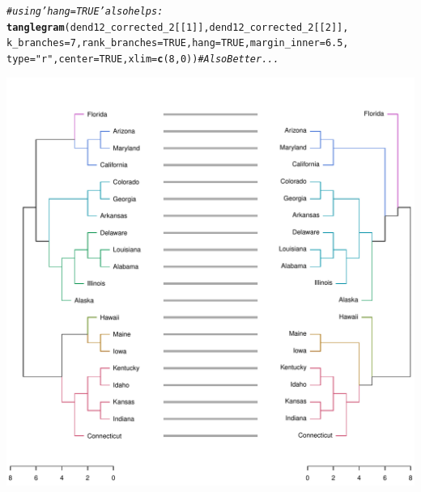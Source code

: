 \documentclass[shortnames,nojss,article]{jss}\usepackage[]{graphicx}\usepackage[]{color}
\makeatletter
\def\maxwidth{ %
  \ifdim\Gin@nat@width>\linewidth
    \linewidth
  \else
    \Gin@nat@width
  \fi
}
\newcommand{\hlnum}[1]{\textcolor[rgb]{0.686,0.059,0.569}{#1}}%
\newcommand{\hlstr}[1]{\textcolor[rgb]{0.192,0.494,0.8}{#1}}%
\newcommand{\hlcom}[1]{\textcolor[rgb]{0.678,0.584,0.686}{\textit{#1}}}%
\newcommand{\hlstd}[1]{\textcolor[rgb]{0.345,0.345,0.345}{#1}}%
\newcommand{\hlkwc}[1]{\textcolor[rgb]{0.333,0.667,0.333}{#1}}%
\newcommand{\hlkwd}[1]{\textcolor[rgb]{0.737,0.353,0.396}{\textbf{#1}}}%
\newenvironment{kframe}{%
 \def\at@end@of@kframe{}%
 \ifinner\ifhmode%
  \def\at@end@of@kframe{\end{minipage}}%
  \begin{minipage}{\columnwidth}%
 \fi\fi%
 \def\FrameCommand##1{\hskip\@totalleftmargin \hskip-\fboxsep
 \colorbox{shadecolor}{##1}\hskip-\fboxsep
     \hskip-\linewidth \hskip-\@totalleftmargin \hskip\columnwidth}%
 \MakeFramed {\advance\hsize-\width
   \@totalleftmargin\z@ \linewidth\hsize
   \@setminipage}}%
 {\par\unskip\endMakeFramed%
 \at@end@of@kframe}
\newenvironment{knitrout}{}{} %
\makeatother
\begin{document}
\begin{knitrout}
{}


\begin{kframe}\begin{alltt}
\hlcom{# using 'hang=TRUE' also helps:}
\hlkwd{tanglegram}\hlstd{(dend12_corrected_2[[}\hlnum{1}\hlstd{]], dend12_corrected_2[[}\hlnum{2}\hlstd{]],}
    \hlkwc{k_branches} \hlstd{=} \hlnum{7}\hlstd{,} \hlkwc{rank_branches} \hlstd{=} \hlnum{TRUE}\hlstd{,} \hlkwc{hang} \hlstd{=} \hlnum{TRUE}\hlstd{,} \hlkwc{margin_inner} \hlstd{=} \hlnum{6.5}\hlstd{,}
    \hlkwc{type} \hlstd{=} \hlstr{"r"}\hlstd{,} \hlkwc{center} \hlstd{=} \hlnum{TRUE}\hlstd{,} \hlkwc{xlim} \hlstd{=} \hlkwd{c}\hlstd{(}\hlnum{8}\hlstd{,} \hlnum{0}\hlstd{))}  \hlcom{# Also Better... }
\end{alltt}
\end{kframe}

{\centering \includegraphics[width=\maxwidth]{figure/untangle_step_rotate_2side_example6} 

}


\begin{kframe}\begin{alltt}



\end{alltt}
\end{kframe}
\end{knitrout}
\end{document}
